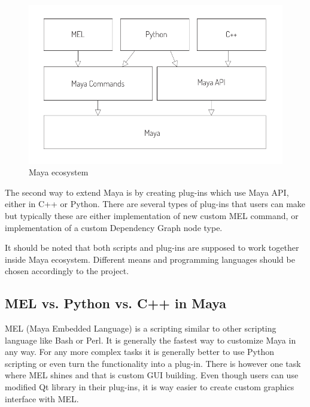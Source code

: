 \documentclass[
  digital, %
  table,   %
  nolof,     %
  nolot,     %
  oneside,
]{fithesis3}
\begin{document}
\begin{figure}
  \centering
  \includegraphics[scale=0.8]{images/maya-ecosystem.pdf}
  \caption{Maya ecosystem}
  \label{fig:maya-ecosystem}
\end{figure}

The second way to extend Maya is by creating plug-ins which use Maya API, either in C++ or Python. There are several types of plug-ins that users can make but typically these are either implementation of new custom MEL command, or implementation of a custom Dependency Graph node type.

It should be noted that both scripts and plug-ins are supposed to work together inside Maya ecosystem. Different means and programming languages should be chosen accordingly to the project. 



\subsection{MEL vs. Python vs. C++ in Maya}
MEL (Maya Embedded Language) is a scripting similar to other scripting language like Bash or Perl. It is generally the fastest way to customize Maya in any way. For any more complex tasks it is generally better to use Python scripting or even turn the functionality into a plug-in. There is however one task where MEL shines and that is custom GUI building. Even though users can use modified Qt library in their plug-ins, it is way easier to create custom graphics interface with MEL.
\end{document}
